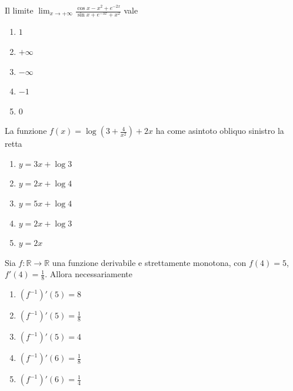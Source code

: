 \begin{quiz}
Il limite $\displaystyle\lim_{x\to+\infty}\frac{\cos x-x^2+e^{-2x}}{\sin x+e^{-3x}+x^2}$ vale
\begin{enumerate}[label=\alph*),leftmargin=1.3cm,itemsep=3pt,topsep=5pt]\item $1$\item $+\infty$\item $-\infty$\item $-1$\item $0$\end{enumerate}
\end{quiz}

\begin{quiz}
La funzione $f(x)=\log\left(3+\frac4{x^2}\right)+2x$ ha come asintoto obliquo sinistro la retta
\begin{enumerate}[label=\alph*),leftmargin=1.3cm,itemsep=3pt,topsep=5pt]\item $y=3x+\log3$\item $y=2x+\log4$\item $y=5x+\log4$\item $y=2x+\log3$\item $y=2x$\end{enumerate}
\end{quiz}

\begin{quiz}
Sia $f:\mathbb R\to\mathbb R$ una funzione derivabile e strettamente monotona, con $f(4)=5$, $f'(4)=\frac18$. Allora necessariamente
\begin{enumerate}[label=\alph*),leftmargin=1.3cm,itemsep=3pt,topsep=5pt]\item $(f^{-1})'(5)=8$\item $(f^{-1})'(5)=\frac18$\item $(f^{-1})'(5)=4$\item $(f^{-1})'(6)=\frac18$\item $(f^{-1})'(6)=\frac14$\end{enumerate}
\end{quiz}

